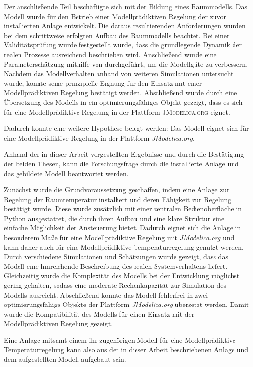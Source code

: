 Der anschließende Teil beschäftigte sich mit der Bildung eines Raummodells. Das Modell wurde für den Betrieb einer Modellprädiktiven Regelung der zuvor installierten Anlage entwickelt. Die daraus resultierenden Anforderungen wurden bei dem schrittweise erfolgten Aufbau des Raummodells beachtet. Bei einer Validitätsprüfung wurde festgestellt wurde, dass die grundlegende Dynamik der realen Prozesse ausreichend beschrieben wird. Anschließend wurde eine Parameterschätzung mithilfe von \cite{casiopeia} durchgeführt, um die Modellgüte zu verbessern. Nachdem das Modellverhalten anhand von weiteren Simulationen untersucht wurde, konnte seine prinzipielle Eignung für den Einsatz mit einer Modellprädiktiven Regelung bestätigt werden. Abschließend wurde durch eine Übersetzung des Modells in ein optimierungsfähiges Objekt gezeigt, dass es sich für eine Modellprädiktive Regelung in der Plattform \textsc{JModelica.org} eignet.


Dadurch konnte eine weitere Hypothese belegt werden: Das Modell eignet sich für eine Modellprädiktive Regelung in der Plattform \textit{JModelica.org}.

Anhand der in dieser Arbeit vorgestellten Ergebnisse und durch die Bestätigung der beiden Thesen, kann die Forschungsfrage durch die installierte Anlage und das gebildete Modell beantwortet werden.

Zunächst wurde die Grundvoraussetzung geschaffen, indem eine Anlage zur Regelung der Raumtemperatur installiert und deren Fähigkeit zur Regelung bestätigt wurde. Diese wurde zusätzlich mit einer zentralen Bedienoberfläche in Python ausgestattet, die durch ihren Aufbau und eine klare Struktur eine einfache Möglichkeit der Ansteuerung bietet. Dadurch eignet sich die Anlage in besonderem Maße für eine Modellprädiktive Regelung mit \textit{JModelica.org} und kann daher auch für eine Modellprädiktive Temperaturregelung genutzt werden. 
Durch verschiedene Simulationen und Schätzungen wurde gezeigt, dass das Modell eine hinreichende Beschreibung des realen Systemverhaltens liefert. Gleichzeitig wurde die Komplexität des Modells bei der Entwicklung möglichst gering gehalten, sodass eine moderate Rechenkapazität zur Simulation des Modells ausreicht. Abschließend konnte das Modell fehlerfrei in zwei optimierungsfähige Objekte der Plattform \textit{JModelica.org} übersetzt werden. Damit wurde die Kompatibilität des Modells für einen Einsatz mit der Modellprädiktiven Regelung gezeigt.

Eine Anlage mitsamt einem ihr zugehörigen Modell für eine Modellprädiktive Temperaturregelung kann also aus der in dieser Arbeit beschriebenen Anlage und dem aufgestellten Modell aufgebaut sein.

